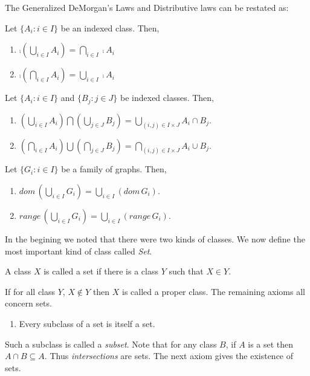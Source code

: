 The Generalized DeMorgan's Laws and Distributive laws can be restated as:
\begin{Theorem}[name=DeMorgan's Laws]
    Let $\lbrace A_i : i \in I \rbrace$ be an indexed class. Then,
    \begin{enumerate}
	\item ${\comp{(\bigcup_{i \in I} A_i)}} = \bigcap_{i \in I} \comp{A_{i}}$
	\item ${\comp{(\bigcap_{i \in I} A_i)}} = \bigcup_{i \in I} \comp{A_{i}}$
    \end{enumerate}
\end{Theorem}

\begin{Theorem}[name=Distributive Laws]
    Let $\lbrace A_i : i \in I \rbrace$ and $\lbrace B_j : j \in J \rbrace$  be indexed classes. 
    Then,
    \begin{enumerate}
	\item ${(\bigcup_{i \in I} A_i) \bigcap (\bigcup_{j \in J} B_j) } = \bigcup_{(i,j) \in I
	    \times J} A_{i} \cap B_{j}$.
	\item ${(\bigcap_{i \in I} A_i) \bigcup (\bigcap_{j \in J} B_j) } = \bigcap_{(i,j) \in I
	    \times J} A_{i} \cup B_{j}$.
    \end{enumerate}
\end{Theorem}

\begin{Theorem}
    Let $\lbrace G_i : i \in I \rbrace$ be a family of graphs. Then,
    \begin{enumerate}
	\item $dom\,(\bigcup_{i \in I} G_i) = \bigcup_{i \in I} (dom\,G_i)$.
	\item $range\,(\bigcup_{i \in I} G_i) = \bigcup_{i \in I} (range\,G_i)$.
    \end{enumerate}
\end{Theorem}

In the begining we noted that there were two kinds of classes. We now define the most important kind
of class called \textit{Set}.
\begin{Definition}
    A class $X$ is called a set if there is a class $Y$ such that $X \in Y$.
\end{Definition}
If for all class $Y$, $X \not\in Y$ then $X$ is called a proper class. The remaining axioms all
concern sets. 

\begin{enumerate}[label=\bfseries Axiom 3:]
    \item Every subclass of a set is itself a set.  
\end{enumerate}
Such a subclass is called a \textit{subset}. Note that for any class $B$, if $A$ is a set then
$A\cap B \subseteq A$. Thus \textit{intersections} are sets. 
The next axiom gives the existence of sets.

